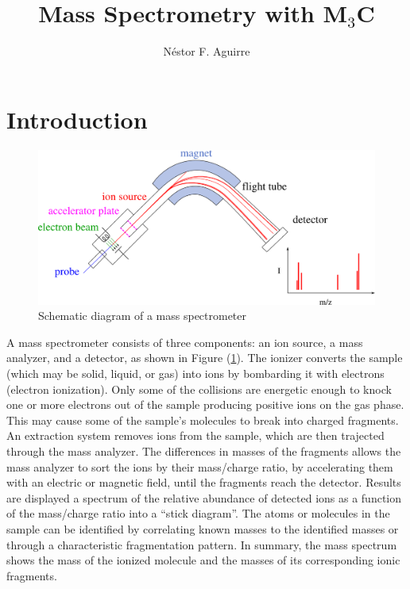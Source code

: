 \documentclass[a4paper,12pt]{article}
\title{
Mass Spectrometry with M$_3$C
}
\author{Néstor F. Aguirre}
\begin{document}

\maketitle

\tableofcontents
\newpage

\section{Introduction}

\begin{figure}[h]
\centering
\includegraphics[scale=0.15]{images/MassSpectrometry.eps}
\caption{\footnotesize{
Schematic diagram of a mass spectrometer
}}
\label{fig: schematic diagram mass spectrometer}
\end{figure}

A mass spectrometer consists of three components: an ion source, a mass analyzer, and a detector, as shown in Figure (\ref{fig: schematic diagram mass spectrometer}). 
The ionizer converts the sample (which may be solid, liquid, or gas) into ions by bombarding it with electrons (electron ionization).
Only some of the collisions are energetic enough to knock one or more electrons out of the sample producing positive ions on the gas phase.
This may cause some of the sample's molecules to break into charged fragments.
An extraction system removes ions from the sample, which are then trajected through the mass analyzer.
The differences in masses of the fragments allows the mass analyzer to sort the ions by their mass/charge ratio, by
accelerating them with an electric or magnetic field, until the fragments reach the detector.
Results are displayed a spectrum of the relative abundance of detected ions as a function of the mass/charge ratio into 
a ``stick diagram''.
The atoms or molecules in the sample can be identified by correlating known masses to the identified masses or through a characteristic fragmentation pattern.
In summary, the mass spectrum shows the mass of the ionized molecule and the masses of its corresponding ionic fragments.
\end{document}
